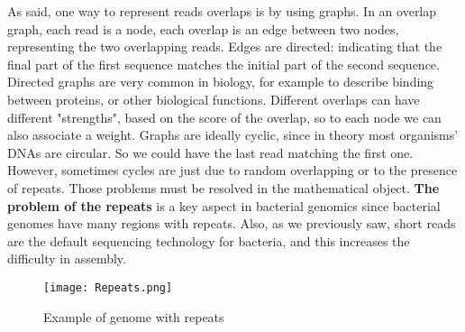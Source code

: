 As said, one way to represent reads overlaps is by using graphs. 
In an overlap graph, each read is a node, each overlap is an edge between two nodes, representing the two overlapping reads. Edges are directed: indicating that the final part of the first sequence matches the initial part of the second sequence. Directed graphs are very common in biology, for example to describe binding between proteins, or other biological functions.
Different overlaps can have different "strengths", based on the score of the overlap, so to each node we can also associate a weight.
Graphs are ideally cyclic, since in theory most organisms' DNAs are circular. So we could have the last read matching the first one. However, sometimes cycles are just due to random overlapping or to the presence of repeats. Those problems must be resolved in the mathematical object.
\textbf{The problem of the repeats} is a key aspect in bacterial genomics since bacterial genomes have many regions with repeats. Also, as we previously saw, short reads are the default sequencing technology for bacteria, and this increases the difficulty in assembly.

\begin{figure}[h]
\centering
\texttt{[image: Repeats.png]}
\caption{Example of genome with repeats}
\end{figure}

